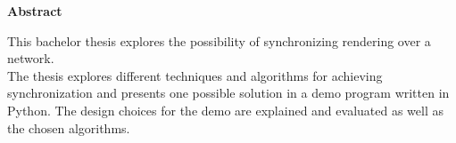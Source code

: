 \mbox{}
\vspace{3cm}
\begin{center}
\begin{minipage}[center]{0.80\textwidth}

\begin{center}
{\normalsize \textbf{Abstract}}
\end{center}
This bachelor thesis explores the possibility of synchronizing rendering over a network. 
\\

The thesis explores different techniques and algorithms for achieving synchronization and presents one possible solution in a demo program written in Python. The design choices for the demo are explained and evaluated as well as the chosen algorithms. 
\end{minipage}
\end{center}
